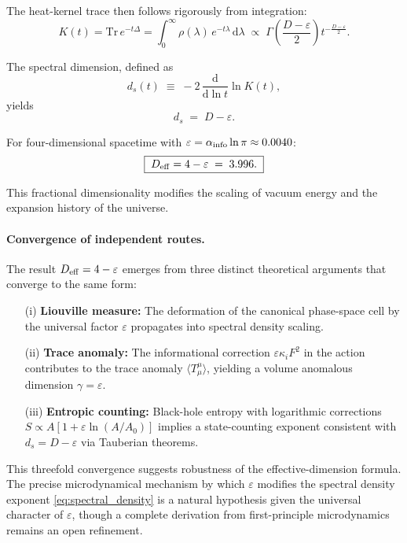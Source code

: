 \documentclass{article}
\numberwithin{equation}{section}
\theoremstyle{plain}
\theoremstyle{definition}
\theoremstyle{remark}
\begin{document}
The heat-kernel trace then follows rigorously from integration:
\begin{equation}
K(t) = \mathrm{Tr}\,e^{-t\Delta} 
= \int_0^\infty \rho(\lambda)\,e^{-t\lambda}\,\mathrm{d}\lambda
\;\propto\; \Gamma\!\left(\frac{D-\varepsilon}{2}\right) t^{-\frac{D-\varepsilon}{2}}.
\end{equation}

The spectral dimension, defined as
\begin{equation}
d_s(t) \;\equiv\; -2\,\frac{\mathrm{d}}{\mathrm{d}\ln t}\ln K(t),
\end{equation}
yields
\begin{equation}
d_s \;=\; D - \varepsilon.
\end{equation}

For four-dimensional spacetime with $\varepsilon = \alpha_{\rm info}\ln\pi \approx 0.0040$:
\begin{equation}
\boxed{\; D_{\rm eff} = 4 - \varepsilon \;=\; 3.996. \;}
\label{eq:D_eff}
\end{equation}

This fractional dimensionality modifies the scaling of vacuum energy and the expansion history of the universe.

\paragraph{Convergence of independent routes.}
The result $D_{\rm eff}=4-\varepsilon$ emerges from three distinct theoretical arguments that converge to the same form: 
\begin{itemize}
\item[(i)] \textbf{Liouville measure:} The deformation of the canonical phase-space cell by the universal factor $\varepsilon$ propagates into spectral density scaling.
\item[(ii)] \textbf{Trace anomaly:} The informational correction $\varepsilon\kappa_i F^2$ in the action contributes to the trace anomaly $\langle T^\mu_\mu\rangle$, yielding a volume anomalous dimension $\gamma=\varepsilon$.
\item[(iii)] \textbf{Entropic counting:} Black-hole entropy with logarithmic corrections $S \propto A[1+\varepsilon\ln(A/A_0)]$ implies a state-counting exponent consistent with $d_s = D-\varepsilon$ via Tauberian theorems.
\end{itemize}

This threefold convergence suggests robustness of the effective-dimension formula. The precise microdynamical mechanism by which $\varepsilon$ modifies the spectral density exponent \eqref{eq:spectral_density} is a natural hypothesis given the universal character of $\varepsilon$, though a complete derivation from first-principle microdynamics remains an open refinement.
\end{document}
